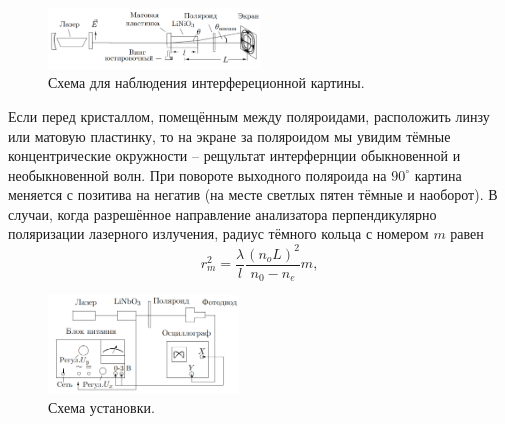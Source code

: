 \documentclass[a4paper,12pt]{article} %
\begin{document}
\begin{figure}
\begin{center}
\includegraphics[width = 0.5\textwidth]{1.png}
\end{center}
\vspace{-20pt}
\caption{Схема для наблюдения интерфереционной картины.}
\end{figure}
Если перед кристаллом, помещённым между поляроидами, расположить линзу или матовую пластинку, то на экране за поляроидом мы увидим тёмные концентрические окружности -- рещультат интерфернции обыкновенной и необыкновенной волн. При повороте выходного поляроида на $90^\circ$ картина меняется с позитива на негатив (на месте светлых пятен тёмные и наоборот). В случаи, когда разрешённое направление анализатора перпендикулярно поляризации лазерного излучения, радиус тёмного кольца с номером $m$ равен
\begin{equation}
r_m^2 = \dfrac{\lambda}{l} \dfrac{(n_oL)^2}{n_0 - n_e}m,
\end{equation}

\begin{figure}
\begin{center}
\includegraphics[width = 0.45\textwidth]{2.png}
\end{center}
\vspace{-20pt}
\caption{Схема установки.}
\end{figure}
\end{document}
